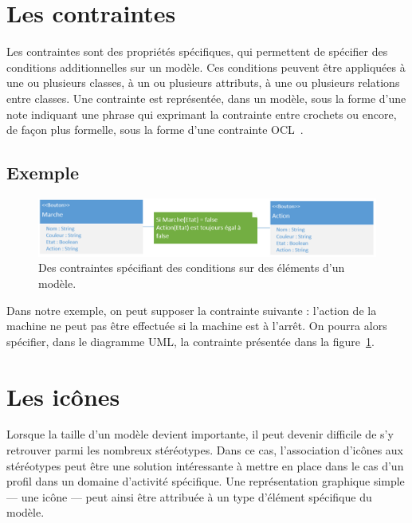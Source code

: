 


\section{Les contraintes}
Les contraintes sont des propriétés spécifiques, qui permettent de sp\'ecifier des conditions additionnelles sur un modèle.
Ces conditions peuvent être appliquées à une ou plusieurs classes, à un ou plusieurs attributs, à une ou plusieurs relations entre classes.
Une contrainte est représent\'ee, dans un modèle, sous la forme d'une note indiquant une phrase qui exprimant la contrainte entre crochets ou encore, de fa\c{c}on plus formelle, sous la forme d'une contrainte OCL~\cite{OCL}.

\subsection*{Exemple}
%
\begin{figure}
    \begin{center}
    \includegraphics[width=\linewidth]{10_img/chap4/constraint.PNG}
    \caption{Des contraintes sp\'ecifiant des conditions sur des \'el\'ements d'un modèle.}
    \label{fig.uml_con}
    \end{center}
\end{figure}



Dans notre exemple, on peut supposer la contrainte suivante : l'action de la machine ne peut pas être effectuée si la machine est à l'arrêt.
On pourra alors sp\'ecifier, dans le diagramme UML, la contrainte présent\'ee dans la figure~\ref{fig.uml_con}.


\section{Les ic\^ones}
Lorsque la taille d'un modèle devient importante, il peut devenir difficile de s'y retrouver parmi les nombreux st\'er\'eotypes.
Dans ce cas, l'association d'ic\^ones aux st\'er\'eotypes peut être une solution int\'eressante à mettre en place dans le cas d'un profil dans un domaine d'activité spécifique.
Une représentation graphique simple --- une ic\^one --- peut ainsi être attribuée à un type d'élément spécifique du modèle.

